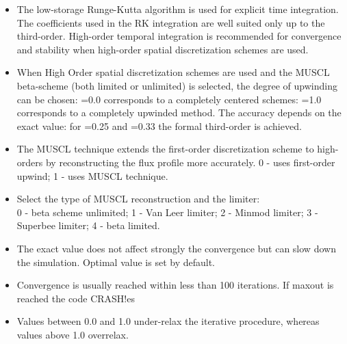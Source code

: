\begin{itemize}

\item
{}
{The low-storage Runge-Kutta algorithm is used for explicit time integration.
The coefficients used in the RK integration are well suited only up to the
third-order. High-order temporal integration is recommended for 
convergence and stability when high-order spatial discretization schemes 
are used.}

\item
{}
{When High Order spatial discretization schemes are used and the MUSCL 
beta-scheme (both limited or unlimited) is selected, the degree of upwinding
can be chosen: =0.0 corresponds to a completely centered schemes:
=1.0 corresponds to a completely upwinded method. The accuracy depends
on the exact value: for =0.25 and =0.33 the formal third-order
is achieved.}

\item
{}
{The MUSCL technique extends the first-order discretization
scheme to high-orders by reconstructing the flux profile more accurately.
0 - uses first-order upwind; 1 - uses MUSCL technique.}

\item
{}
{Select the type of MUSCL reconstruction and the limiter:\\
0 - beta scheme unlimited; 1 - Van Leer limiter; 2 - Minmod limiter;
3 - Superbee limiter; 4 - beta limited.}

\item
{}
{The exact value does not affect strongly the convergence but can slow down
the simulation. Optimal value is set by default.}

\item
{}
{Convergence is usually reached within less than 100 iterations. If maxout is reached the code CRASH!es}

\item
{}
{Values between 0.0 and 1.0 under-relax the iterative procedure, whereas
values above 1.0 overrelax.}


\end{itemize}
